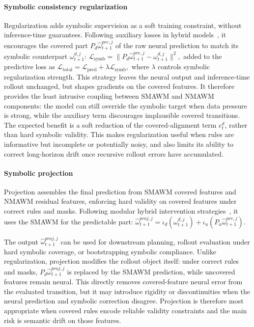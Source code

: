 \documentclass{article}
\theoremstyle{plain}
\theoremstyle{definition}
\theoremstyle{remark}
\begin{document}
\paragraph{Symbolic consistency regularization}
\label{sec:symbolic_loss_regularization}

Regularization adds symbolic supervision as a soft training constraint, without inference-time guarantees. Following auxiliary losses in hybrid models~\cite{Xu2018semanticloss, garcez2023neurosymbolic}, it encourages the covered part $P_d\hat{\omega}^{pre,j}_{t+1}$ of the raw neural prediction to match its symbolic counterpart $\omega^{d,j}_{t+1}$:
$    \mathcal{L}_{\text{symb}} = \| P_d\hat{\omega}^{pre,j}_{t+1} - \omega^{d,j}_{t+1} \|^2,
$
added to the predictive loss as
$
  \mathcal{L}_{\text{total}} = \mathcal{L}_{\text{pred}} + \lambda \mathcal{L}_{\text{symb}},
$
where $\lambda$ controls symbolic regularization strength.
This strategy leaves the neural output and inference-time rollout unchanged, but shapes gradients on the covered features. It therefore provides the least intrusive coupling between SMAWM and NMAWM components: the model can still override the symbolic target when data pressure is strong, while the auxiliary term discourages implausible covered transitions. The expected benefit is a soft reduction of the covered-alignment term $e^d_t$, rather than hard symbolic validity. This makes regularization useful when rules are informative but incomplete or potentially noisy, and also limits its ability to correct long-horizon drift once recursive rollout errors have accumulated.

\paragraph{Symbolic projection}
\label{sec:symbolic_projection}

Projection assembles the final prediction from SMAWM covered features and NMAWM residual features, enforcing hard validity on covered features under correct rules and masks. Following modular hybrid intervention strategies~\cite{garnelo2016deepsymbolicreinforcementlearning}, it uses the SMAWM for the predictable part:
$\hat{\omega}^{proj,j}_{t+1}
  =
  \iota_d(\omega^{d,j}_{t+1})
  + \iota_u(P_u\hat{\omega}^{pre,j}_{t+1}).$

The output $\hat{\omega}^{proj,j}_{t+1}$ can be used for downstream planning, rollout evaluation under hard symbolic coverage, or bootstrapping symbolic compliance. Unlike regularization, projection modifies the rollout object itself: under correct rules and masks, $P_d\hat{\omega}^{proj,j}_{t+1}$ is replaced by the SMAWM prediction, while uncovered features remain neural. This directly removes covered-feature neural error from the evaluated transition, but it may introduce rigidity or discontinuities when the neural prediction and symbolic correction disagree. Projection is therefore most appropriate when covered rules encode reliable validity constraints and the main risk is semantic drift on those features.
\end{document}
